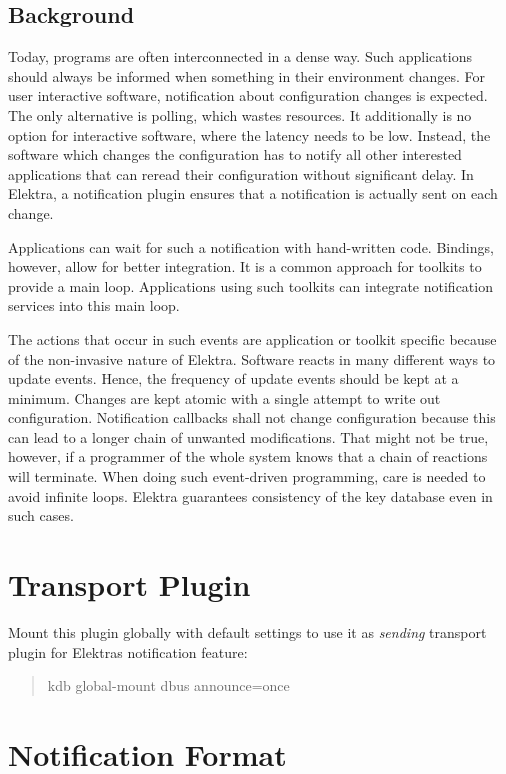 \subsection*{Background}

Today, programs are often interconnected in a dense way. Such applications should always be informed when something in their environment changes. For user interactive software, notification about configuration changes is expected. The only alternative is polling, which wastes resources. It additionally is no option for interactive software, where the latency needs to be low. Instead, the software which changes the configuration has to notify all other interested applications that can reread their configuration without significant delay. In Elektra, a notification plugin ensures that a notification is actually sent on each change.

Applications can wait for such a notification with hand-\/written code. Bindings, however, allow for better integration. It is a common approach for toolkits to provide a main loop. Applications using such toolkits can integrate notification services into this main loop.

The actions that occur in such events are application or toolkit specific because of the non-\/invasive nature of Elektra. Software reacts in many different ways to update events. Hence, the frequency of update events should be kept at a minimum. Changes are kept atomic with a single attempt to write out configuration. Notification callbacks shall not change configuration because this can lead to a longer chain of unwanted modifications. That might not be true, however, if a programmer of the whole system knows that a chain of reactions will terminate. When doing such event-\/driven programming, care is needed to avoid infinite loops. Elektra guarantees consistency of the key database even in such cases.

\section*{Transport Plugin}

Mount this plugin globally with default settings to use it as {\itshape sending} transport plugin for Elektra\textquotesingle{}s notification feature\+:

\begin{quote}
kdb global-\/mount dbus announce=once \end{quote}


\section*{Notification Format}


